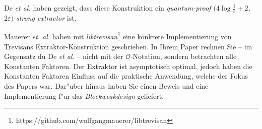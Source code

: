 De \emph{et al.} \cite{de2012trevisan} haben gezeigt, dass diese Konstruktion ein \emph{quantum-proof $(4 \log \frac{1}{\varepsilon} + 2$, $2\varepsilon)$-strong extractor} ist.

Mauerer \emph{et. al.} \cite{mauerer2012modular} haben mit \emph{libtrevisan}\footnote{https://github.com/wolfgangmauerer/libtrevisan} eine konkrete Implementierung von Trevisans Extraktor-Konstruktion \cite{trevisan2001extractors} geschrieben. In Ihrem Paper rechnen Sie -- im Gegensatz du De \emph{et al.} -- nicht mit der $\mathcal O$-Notation, sondern betrachten alle Konstanten Faktoren. Der Extraktor ist asymptotisch optimal, jedoch haben die Konstanten Faktoren Einfluss auf die praktische Anwendung, welche der Fokus des Papers war. Dar"uber hinaus haben Sie einen Beweis und eine Implementierung f"ur das \emph{Blockweakdesign} geliefert.
